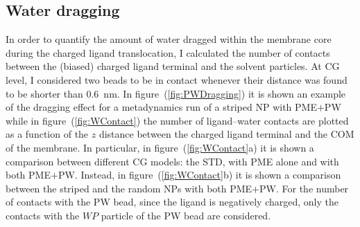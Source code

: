 \subsection{Water dragging}
\label{sec:WDragging}
In order to quantify the amount of water dragged within the membrane core during the charged ligand translocation, 
I calculated the number of contacts between the (biased) charged ligand terminal and the solvent particles. At 
\ac{CG} level, I considered two beads to be in contact whenever their distance was found to be shorter than 
$0.6$~nm. In figure~(\ref{fig:PWDragging}) it is shown an example of the dragging effect for a metadynamics run of 
a striped \ac{NP} with \ac{PME}$+$\ac{PW} while in figure~(\ref{fig:WContact}) the number of ligand--water 
contacts are plotted as a function of the $z$ distance between the charged ligand terminal and the \ac{COM} of the 
membrane. In particular, in figure~(\ref{fig:WContact}a) it is shown a comparison between different \ac{CG} 
\martini{} models: the \ac{STD}, with \ac{PME} alone and with both \ac{PME}$+$\ac{PW}. Instead, in 
figure~(\ref{fig:WContact}b) it is shown a comparison between the striped and the random \acp{NP} with both 
\ac{PME}$+$\ac{PW}. For the number of contacts with the \ac{PW} bead, since the ligand is negatively charged, only 
the contacts with the $WP$ particle of the \ac{PW} bead are considered.
